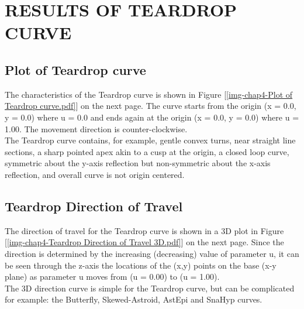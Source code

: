\clearpage
\pagebreak
\section{RESULTS OF TEARDROP CURVE}


\subsection{Plot of Teardrop curve} 
\label{ssec-chap4-Plot of Teardrop curve}

The characteristics of the Teardrop curve is shown in Figure [\ref  {img-chap4-Plot of Teardrop curve.pdf}] on the next page. The curve starts from the origin (x = 0.0, y = 0.0) where u = 0.0 and ends again at the origin (x = 0.0, y = 0.0) where u = 1.00. The movement direction is counter-clockwise.\\

The Teardrop curve contains, for example, gentle convex turns, near straight line sections, a sharp pointed apex akin to a cusp at the origin, a closed loop curve, symmetric about the y-axis reflection but non-symmetric about the x-axis reflection, and overall curve is not origin centered.  

\subsection{Teardrop Direction of Travel} 
\label{ssec-chap4-Teardrop Direction of Travel}  

The direction of travel for the Teardrop curve is shown in a 3D plot in Figure [\ref  {img-chap4-Teardrop Direction of Travel 3D.pdf}] on the next page. Since the direction is determined by the increasing (decreasing) value of parameter u, it can be seen through the z-axis the locations of the (x,y) points on the base (x-y plane) as parameter u moves from (u = 0.00) to (u = 1.00). \\

The 3D direction curve is simple for the Teardrop curve, but can be complicated for example: the Butterfly, Skewed-Astroid, AstEpi and SnaHyp curves. 



\clearpage
\pagebreak

